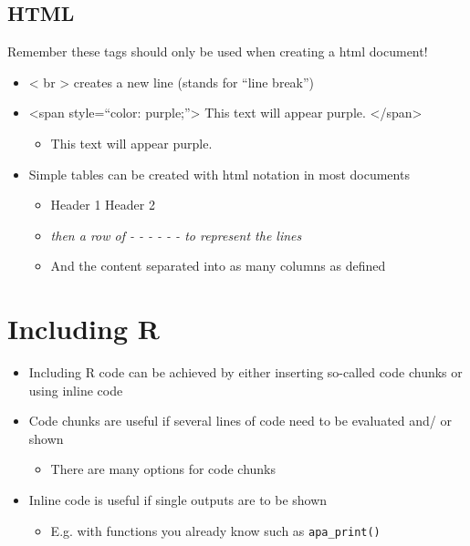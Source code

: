 \documentclass[
]{book}
\providecommand{\tightlist}{%
  \setlength{\itemsep}{0pt}\setlength{\parskip}{0pt}}
\begin{document}
\subsection{HTML}\label{html}

Remember these tags should only be used when creating a html document!

\begin{itemize}
\tightlist
\item
  \textless{} br \textgreater{} creates a new line (stands for ``line break'')
\item
  \textless span style=``color: purple;''\textgreater{} This text will appear purple. \textless/span\textgreater{}

  \begin{itemize}
  \tightlist
  \item
    { This text will appear purple. }
  \end{itemize}
\item
  Simple tables can be created with html notation in most documents

  \begin{itemize}
  \tightlist
  \item
    Header 1 \textbar{} Header 2
  \item
    \emph{then a row of - - - \textbar{} - - - to represent the lines}
  \item
    And the content separated \textbar{} into as many columns as defined
  \end{itemize}
\end{itemize}

\section{Including R}\label{including-r}

\begin{itemize}
\tightlist
\item
  Including R code can be achieved by either inserting so-called code chunks or using inline code
\item
  Code chunks are useful if several lines of code need to be evaluated and/ or shown

  \begin{itemize}
  \tightlist
  \item
    There are many options for code chunks
  \end{itemize}
\item
  Inline code is useful if single outputs are to be shown

  \begin{itemize}
  \tightlist
  \item
    E.g. with functions you already know such as \texttt{apa\_print()}
  \end{itemize}
\end{itemize}
\end{document}
